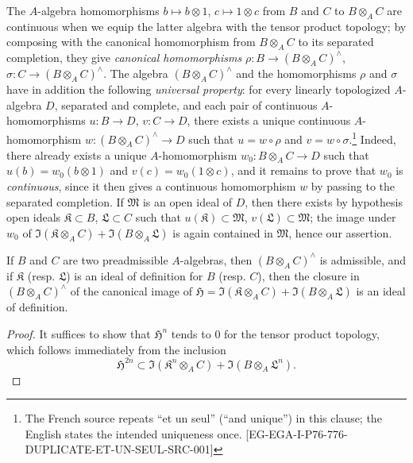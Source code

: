 \begin{env}[7.7.6]
\label{0.7.7.6}
The $A$-algebra homomorphisms $b\mapsto b\otimes 1$, $c\mapsto 1\otimes c$ from $B$ and $C$ to
$B\otimes_A C$ are continuous when we equip the latter algebra with the tensor product topology; by
composing with the canonical homomorphism from $B\otimes_A C$ to its separated completion, they
give \emph{canonical homomorphisms} $\rho:B\to(B\otimes_A C)^\wedge$,
$\sigma:C\to(B\otimes_A C)^\wedge$. The algebra $(B\otimes_A C)^\wedge$ and the homomorphisms
$\rho$ and $\sigma$ have in addition the following \emph{universal property}: for every linearly
topologized $A$-algebra $D$, separated and complete, and each pair of continuous $A$-homomorphisms
$u:B\to D$, $v:C\to D$, there exists a unique continuous $A$-homomorphism
$w:(B\otimes_A C)^\wedge\to D$ such that $u=w\circ\rho$ and $v=w\circ\sigma$.\footnote{The French
source repeats ``et un seul'' (``and unique'') in this clause; the English states the intended
uniqueness once. [EG-EGA-I-P76-776-DUPLICATE-ET-UN-SEUL-SRC-001]} Indeed, there already
exists a unique $A$-homomorphism $w_0:B\otimes_A C\to D$ such that $u(b)=w_0(b\otimes 1)$ and
$v(c)=w_0(1\otimes c)$, and it remains to prove that $w_0$ is \emph{continuous}, since it then gives a
continuous homomorphism $w$ by passing to the separated completion. If $\mathfrak{M}$ is an open
ideal of $D$, then there exists by hypothesis open ideals $\mathfrak{K}\subset B$,
$\mathfrak{L}\subset C$ such that $u(\mathfrak{K})\subset\mathfrak{M}$,
$v(\mathfrak{L})\subset\mathfrak{M}$; the image under $w_0$ of
$\Im(\mathfrak{K}\otimes_A C)+\Im(B\otimes_A\mathfrak{L})$ is again contained in $\mathfrak{M}$,
hence our assertion.
\end{env}

\begin{proposition}[7.7.7]
\label{0.7.7.7}
If $B$ and $C$ are two preadmissible $A$-algebras, then $(B\otimes_A C)^\wedge$ is
admissible, and if $\mathfrak{K}$ (resp. $\mathfrak{L}$) is an ideal of definition for
$B$ (resp. $C$), then the closure in $(B\otimes_A C)^\wedge$ of the canonical image of
$\mathfrak{H}=\Im(\mathfrak{K}\otimes_A C)+\Im(B\otimes_A\mathfrak{L})$ is an ideal of definition.
\end{proposition}

\begin{proof}
It suffices to show that $\mathfrak{H}^n$ tends to $0$ for the tensor product topology, which follows immediately from the inclusion
\[
  \mathfrak{H}^{2n}\subset\Im(\mathfrak{K}^n\otimes_A C)+\Im(B\otimes_A\mathfrak{L}^n).
\]
\end{proof}


